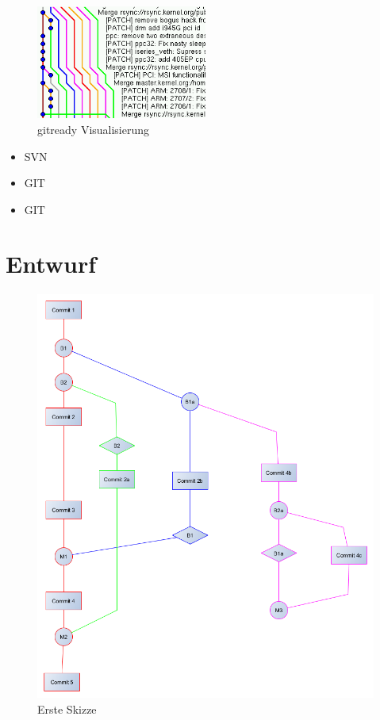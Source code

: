 \documentclass[color, ddc]{tudscrreprt}
\begin{document}
\begin{figure}[ht!]
\centering
\includegraphics[width=0.5\textwidth]{Skizzen/gitready-gitk.png}
\caption{gitready Visualisierung}
\end{figure}
\begin{itemize}
\item SVN \cite{url:svn-gource}
\item GIT \cite{url:git}
\item GIT \cite{url:gitready}
\end{itemize}

\section{Entwurf}

\newpage
\begin{figure}[ht!]
\centering
\includegraphics[width=\textwidth]{Skizzen/2014-12-12 VisualisierungsSkizze.png}
\caption{Erste Skizze}
\end{figure}
\end{document}
